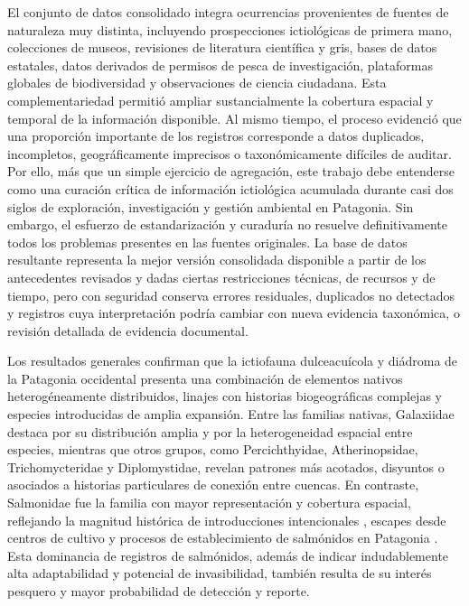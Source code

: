\documentclass[sn-apa,pdflatex]{sn-jnl}
\begin{document}
El conjunto de datos consolidado integra ocurrencias provenientes de
fuentes de naturaleza muy distinta, incluyendo prospecciones
ictiológicas de primera mano, colecciones de museos, revisiones de
literatura científica y gris, bases de datos estatales, datos derivados
de permisos de pesca de investigación, plataformas globales de
biodiversidad y observaciones de ciencia ciudadana. Esta
complementariedad permitió ampliar sustancialmente la cobertura espacial
y temporal de la información disponible. Al mismo tiempo, el proceso
evidenció que una proporción importante de los registros corresponde a
datos duplicados, incompletos, geográficamente imprecisos o
taxonómicamente difíciles de auditar. Por ello, más que un simple
ejercicio de agregación, este trabajo debe entenderse como una curación
crítica de información ictiológica acumulada durante casi dos siglos de
exploración, investigación y gestión ambiental en Patagonia. Sin
embargo, el esfuerzo de estandarización y curaduría no resuelve
definitivamente todos los problemas presentes en las fuentes originales.
La base de datos resultante representa la mejor versión consolidada
disponible a partir de los antecedentes revisados y dadas ciertas
restricciones técnicas, de recursos y de tiempo, pero con seguridad
conserva errores residuales, duplicados no detectados y registros cuya
interpretación podría cambiar con nueva evidencia taxonómica, o revisión
detallada de evidencia documental.

Los resultados generales confirman que la ictiofauna dulceacuícola y
diádroma de la Patagonia occidental presenta una combinación de
elementos nativos heterogéneamente distribuidos, linajes con historias
biogeográficas complejas y especies introducidas de amplia expansión.
Entre las familias nativas, Galaxiidae destaca por su distribución
amplia y por la heterogeneidad espacial entre especies, mientras que
otros grupos, como Percichthyidae, Atherinopsidae, Trichomycteridae y
Diplomystidae, revelan patrones más acotados, disyuntos o asociados a
historias particulares de conexión entre cuencas. En contraste,
Salmonidae fue la familia con mayor representación y cobertura espacial,
reflejando la magnitud histórica de introducciones intencionales
\citep{basultoLargoViajeSalmones2003}, escapes desde centros de cultivo
\citep{sepulvedaEscapedFarmedSalmon2013, sotoEnvironmentalRiskAssessment2022}
y procesos de establecimiento de salmónidos en Patagonia
\citep[e.g.,][]{correaChinookSalmonInvade2008, chaldeDetectionJuvenileCoho2023}.
Esta dominancia de registros de salmónidos, además de indicar
indudablemente alta adaptabilidad y potencial de invasibilidad, también
resulta de su interés pesquero y mayor probabilidad de detección y
reporte.
\end{document}
